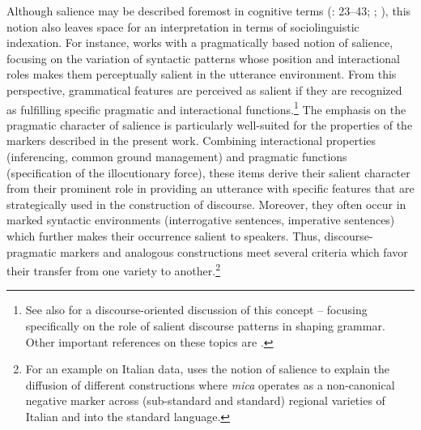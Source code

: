 Although salience may be described foremost in cognitive terms (\citealt{Rácz2013}: 23–43; \citealt{Schmid2007}; \citealt{TomlinMyachykov2015}), this notion also leaves space for an interpretation in terms of sociolinguistic indexation. For instance, \citet{Cheshire1996,Cheshire1997,Cheshire2009} works with a pragmatically based notion of salience, focusing on the variation of syntactic patterns whose position and interactional roles makes them perceptually salient in the utterance environment. From this perspective, grammatical features are perceived as salient if they are recognized as fulfilling specific pragmatic and interactional functions.\footnote{See also \citet[168–211]{Ariel2008} for a discourse-oriented discussion of this concept – focusing specifically on the role of salient discourse patterns in shaping grammar. Other important references on these topics are \citet{Du_bois1987,Du_bois2003}.} The emphasis on the pragmatic character of salience is particularly well-suited for the properties of the markers described in the present work. Combining interactional properties (inferencing, common ground management) and pragmatic functions (specification of the illocutionary force), these items derive their salient character from their prominent role in providing an utterance with specific features that are strategically used in the construction of discourse. Moreover, they often occur in marked syntactic environments (interrogative sentences, imperative sentences) which further makes their occurrence salient to speakers. Thus, discourse-prag\-mat\-ic markers and analogous constructions meet several criteria which favor their transfer from one variety to another.\footnote{For an example on Italian data, \citet{Cerruti2020} uses the notion of salience to explain the diffusion of different constructions where \textit{mica} operates as a non-canonical negative marker across (sub-standard and standard) regional varieties of Italian and into the standard language. }

